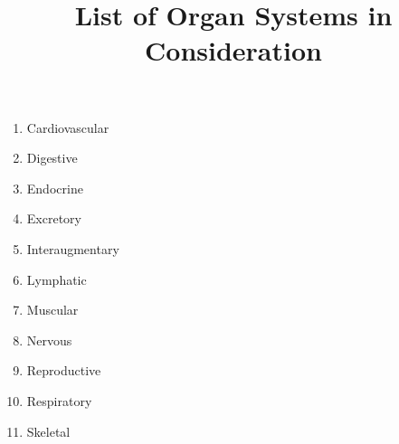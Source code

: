 \documentclass{article}
\title{List of Organ Systems in Consideration}
\date{}
\begin{document}
\maketitle

\begin{multicols}{3}
  \begin{enumerate}
    \item Cardiovascular
    \item Digestive
    \item Endocrine
    \item Excretory
    \item Interaugmentary
    \item Lymphatic
    \item Muscular
    \item Nervous
    \item Reproductive
    \item Respiratory
    \item Skeletal
  \end{enumerate}
\end{multicols}
\end{document}
